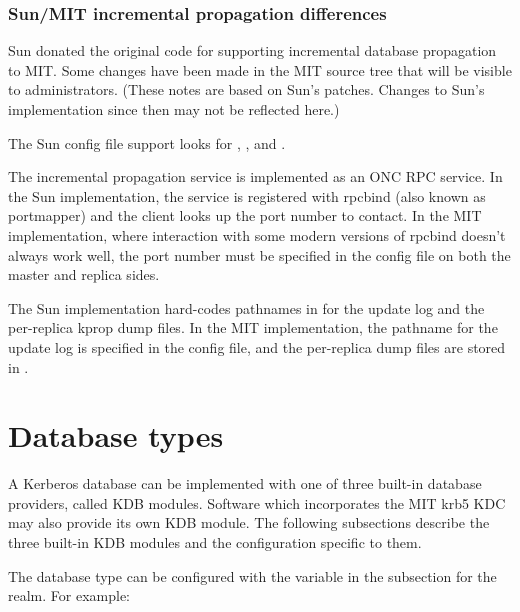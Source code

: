 \documentclass[letterpaper,10pt,english]{sphinxmanual}
\begin{document}
\subsection{Sun/MIT incremental propagation differences}
\label{\detokenize{admin/database:sun-mit-incremental-propagation-differences}}
Sun donated the original code for supporting incremental database
propagation to MIT.  Some changes have been made in the MIT source
tree that will be visible to administrators.  (These notes are based
on Sun’s patches.  Changes to Sun’s implementation since then may not
be reflected here.)

The Sun config file support looks for ,
, and .

The incremental propagation service is implemented as an ONC RPC
service.  In the Sun implementation, the service is registered with
rpcbind (also known as portmapper) and the client looks up the port
number to contact.  In the MIT implementation, where interaction with
some modern versions of rpcbind doesn’t always work well, the port
number must be specified in the config file on both the master and
replica sides.

The Sun implementation hard-codes pathnames in  for the
update log and the per-replica kprop dump files.  In the MIT
implementation, the pathname for the update log is specified in the
config file, and the per-replica dump files are stored in
{\hyperref[\detokenize{mitK5defaults:paths}]{}}.


\chapter{Database types}
\label{\detokenize{admin/dbtypes::doc}}\label{\detokenize{admin/dbtypes:database-types}}
A Kerberos database can be implemented with one of three built-in
database providers, called KDB modules.  Software which incorporates
the MIT krb5 KDC may also provide its own KDB module.  The following
subsections describe the three built-in KDB modules and the
configuration specific to them.

The database type can be configured with the  variable
in the {\hyperref[\detokenize{admin/conf_files/kdc_conf:dbmodules}]{}} subsection for the realm.  For example:
\end{document}
